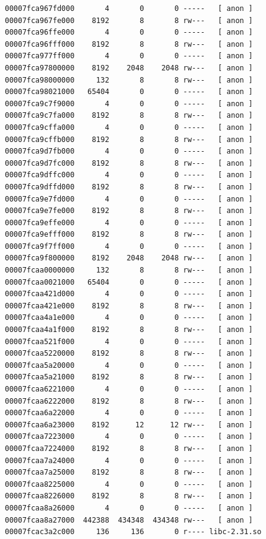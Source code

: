 \documentclass[11pt, a4paper]{article}
\begin{document}
\begin{Verbatim}[fontsize=\small]
00007fca967fd000       4       0       0 -----   [ anon ]
00007fca967fe000    8192       8       8 rw---   [ anon ]
00007fca96ffe000       4       0       0 -----   [ anon ]
00007fca96fff000    8192       8       8 rw---   [ anon ]
00007fca977ff000       4       0       0 -----   [ anon ]
00007fca97800000    8192    2048    2048 rw---   [ anon ]
00007fca98000000     132       8       8 rw---   [ anon ]
00007fca98021000   65404       0       0 -----   [ anon ]
00007fca9c7f9000       4       0       0 -----   [ anon ]
00007fca9c7fa000    8192       8       8 rw---   [ anon ]
00007fca9cffa000       4       0       0 -----   [ anon ]
00007fca9cffb000    8192       8       8 rw---   [ anon ]
00007fca9d7fb000       4       0       0 -----   [ anon ]
00007fca9d7fc000    8192       8       8 rw---   [ anon ]
00007fca9dffc000       4       0       0 -----   [ anon ]
00007fca9dffd000    8192       8       8 rw---   [ anon ]
00007fca9e7fd000       4       0       0 -----   [ anon ]
00007fca9e7fe000    8192       8       8 rw---   [ anon ]
00007fca9effe000       4       0       0 -----   [ anon ]
00007fca9efff000    8192       8       8 rw---   [ anon ]
00007fca9f7ff000       4       0       0 -----   [ anon ]
00007fca9f800000    8192    2048    2048 rw---   [ anon ]
00007fcaa0000000     132       8       8 rw---   [ anon ]
00007fcaa0021000   65404       0       0 -----   [ anon ]
00007fcaa421d000       4       0       0 -----   [ anon ]
00007fcaa421e000    8192       8       8 rw---   [ anon ]
00007fcaa4a1e000       4       0       0 -----   [ anon ]
00007fcaa4a1f000    8192       8       8 rw---   [ anon ]
00007fcaa521f000       4       0       0 -----   [ anon ]
00007fcaa5220000    8192       8       8 rw---   [ anon ]
00007fcaa5a20000       4       0       0 -----   [ anon ]
00007fcaa5a21000    8192       8       8 rw---   [ anon ]
00007fcaa6221000       4       0       0 -----   [ anon ]
00007fcaa6222000    8192       8       8 rw---   [ anon ]
00007fcaa6a22000       4       0       0 -----   [ anon ]
00007fcaa6a23000    8192      12      12 rw---   [ anon ]
00007fcaa7223000       4       0       0 -----   [ anon ]
00007fcaa7224000    8192       8       8 rw---   [ anon ]
00007fcaa7a24000       4       0       0 -----   [ anon ]
00007fcaa7a25000    8192       8       8 rw---   [ anon ]
00007fcaa8225000       4       0       0 -----   [ anon ]
00007fcaa8226000    8192       8       8 rw---   [ anon ]
00007fcaa8a26000       4       0       0 -----   [ anon ]
00007fcaa8a27000  442388  434348  434348 rw---   [ anon ]
00007fcac3a2c000     136     136       0 r---- libc-2.31.so

\end{Verbatim}
\end{document}
